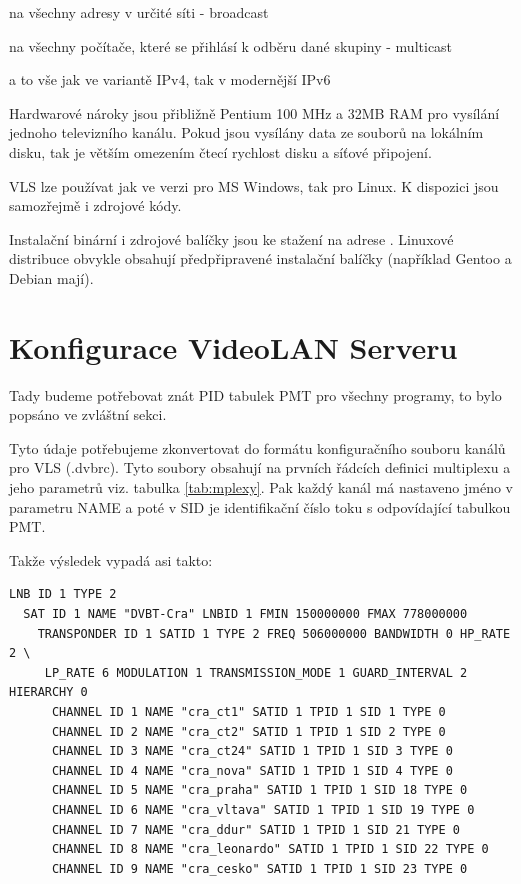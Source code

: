 na všechny adresy v určité síti - broadcast

na všechny počítače, které se přihlásí k odběru dané skupiny - multicast

a to vše jak ve variantě IPv4, tak v modernější IPv6

\vspace{10pt}

Hardwarové nároky jsou přibližně Pentium 100 MHz a 32MB RAM pro vysílání jednoho televizního kanálu. Pokud jsou vysílány data ze souborů na lokálním disku, tak je větším omezením čtecí rychlost disku a síťové připojení.

\vspace{10pt}

VLS lze používat jak ve verzi pro MS Windows, tak pro Linux. K dispozici jsou samozřejmě i zdrojové kódy.

\vspace{10pt}

Instalační binární i zdrojové balíčky jsou ke stažení na adrese \cite{videolanURL}.
Linuxové distribuce obvykle obsahují předpřipravené instalační balíčky (například Gentoo a Debian mají). 

\vspace{10pt}

\section{Konfigurace VideoLAN Serveru}
\vspace{10pt}

Tady budeme potřebovat znát PID tabulek PMT pro všechny programy, to bylo popsáno ve zvláštní sekci.

Tyto údaje potřebujeme zkonvertovat do formátu konfiguračního souboru kanálů pro VLS (.dvbrc). Tyto soubory obsahují na prvních řádcích definici multiplexu a jeho parametrů viz. tabulka \ref{tab:mplexy}. Pak každý kanál má nastaveno jméno v parametru NAME a poté v SID je identifikační číslo toku s odpovídající tabulkou PMT.

Takže výsledek vypadá asi takto:

\vspace{10pt}

\begin{small}
\begin{verbatim}
LNB ID 1 TYPE 2
  SAT ID 1 NAME "DVBT-Cra" LNBID 1 FMIN 150000000 FMAX 778000000
    TRANSPONDER ID 1 SATID 1 TYPE 2 FREQ 506000000 BANDWIDTH 0 HP_RATE 2 \
     LP_RATE 6 MODULATION 1 TRANSMISSION_MODE 1 GUARD_INTERVAL 2 HIERARCHY 0
      CHANNEL ID 1 NAME "cra_ct1" SATID 1 TPID 1 SID 1 TYPE 0
      CHANNEL ID 2 NAME "cra_ct2" SATID 1 TPID 1 SID 2 TYPE 0
      CHANNEL ID 3 NAME "cra_ct24" SATID 1 TPID 1 SID 3 TYPE 0
      CHANNEL ID 4 NAME "cra_nova" SATID 1 TPID 1 SID 4 TYPE 0
      CHANNEL ID 5 NAME "cra_praha" SATID 1 TPID 1 SID 18 TYPE 0
      CHANNEL ID 6 NAME "cra_vltava" SATID 1 TPID 1 SID 19 TYPE 0
      CHANNEL ID 7 NAME "cra_ddur" SATID 1 TPID 1 SID 21 TYPE 0
      CHANNEL ID 8 NAME "cra_leonardo" SATID 1 TPID 1 SID 22 TYPE 0
      CHANNEL ID 9 NAME "cra_cesko" SATID 1 TPID 1 SID 23 TYPE 0
\end{verbatim}
\end{small}

